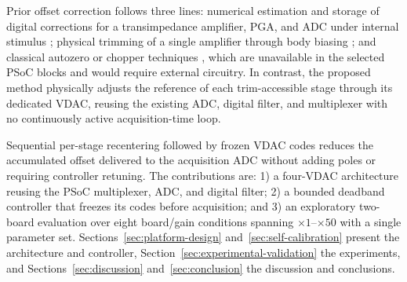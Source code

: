 Prior offset correction follows three lines: numerical estimation and storage of digital corrections for a transimpedance amplifier, PGA, and ADC under internal stimulus \cite{Lopin2018,InfineonAN68403}; physical trimming of a single amplifier through body biasing \cite{Mohan2020}; and classical autozero or chopper techniques \cite{EnzTemes1996}, which are unavailable in the selected PSoC blocks and would require external circuitry. In contrast, the proposed method physically adjusts the reference of each trim-accessible stage through its dedicated VDAC, reusing the existing ADC, digital filter, and multiplexer with no continuously active acquisition-time loop.

Sequential per-stage recentering followed by frozen VDAC codes reduces the accumulated offset delivered to the acquisition ADC without adding poles or requiring controller retuning. The contributions are: 1) a four-VDAC architecture reusing the PSoC multiplexer, ADC, and digital filter; 2) a bounded deadband controller that freezes its codes before acquisition; and 3) an exploratory two-board evaluation over eight board/gain conditions spanning $\times1$--$\times50$ with a single parameter set. Sections~\ref{sec:platform-design} and~\ref{sec:self-calibration} present the architecture and controller, Section~\ref{sec:experimental-validation} the experiments, and Sections~\ref{sec:discussion} and~\ref{sec:conclusion} the discussion and conclusions.

